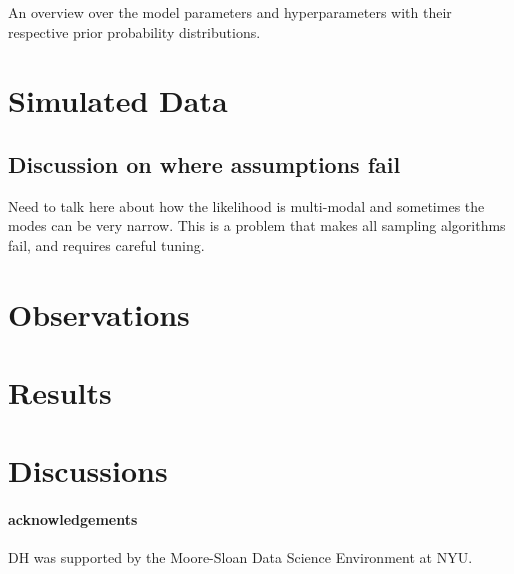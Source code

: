 \documentclass[12pt]{emulateapj}
\begin{document}
\begin{table*}[hbtp]
\begin{threeparttable}
\begin{tabularx}{\textwidth}{p{4.0cm}p{7.0cm}X}
\end{tabularx}
   \begin{tablenotes}
      \item{An overview over the model parameters and hyperparameters with their respective prior probability distributions.}
\end{tablenotes}
\end{threeparttable}
\label{tab:priortable}
\end{table*}



\section{Simulated Data}

\subsection{Discussion on where assumptions fail}

Need to talk here about how the likelihood is multi-modal and sometimes the modes can be very narrow. 
This is a problem that makes all sampling algorithms fail, and requires careful tuning.


\section{Observations}

\section{Results}


\section{Discussions}



\paragraph{acknowledgements}
DH was supported by the Moore-Sloan Data Science Environment at NYU. 



\end{document}
